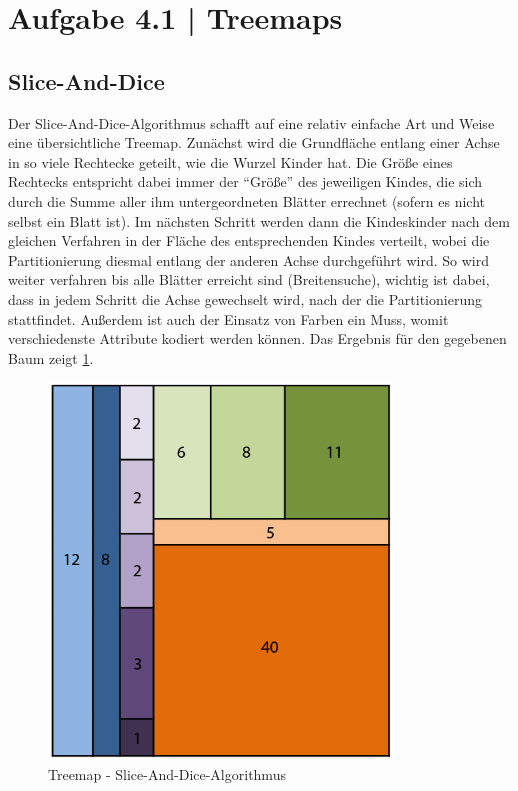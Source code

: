 \documentclass[a4paper,12pt,ngerman]{scrartcl}
\begin{document}
\pagestyle{fancy} %

\section{Aufgabe 4.1 | Treemaps}
\subsection*{Slice-And-Dice}

Der Slice-And-Dice-Algorithmus schafft auf eine relativ einfache Art und Weise eine übersichtliche Treemap. Zunächst wird die Grundfläche entlang einer Achse in so viele Rechtecke geteilt, wie die Wurzel Kinder hat. Die Größe eines Rechtecks entspricht dabei immer der \enquote{Größe} des jeweiligen Kindes, die sich durch die Summe aller ihm untergeordneten Blätter errechnet (sofern es nicht selbst ein Blatt ist). Im nächsten Schritt werden dann die Kindeskinder nach dem gleichen Verfahren in der Fläche des entsprechenden Kindes verteilt, wobei die Partitionierung diesmal entlang der anderen Achse durchgeführt wird. So wird weiter verfahren bis alle Blätter erreicht sind (Breitensuche), wichtig ist dabei, dass in jedem Schritt die Achse gewechselt wird, nach der die Partitionierung stattfindet. Außerdem ist auch der Einsatz von Farben ein Muss, womit verschiedenste Attribute kodiert werden können. Das Ergebnis für den gegebenen Baum zeigt \cref{fig:sliceAndDice}.

\begin{figure}[ht]
    \centering
    \includegraphics[height=10cm]{includes/SliceAndDice}
    \caption{Treemap - Slice-And-Dice-Algorithmus}
    \label{fig:sliceAndDice}
\end{figure}
\end{document}
